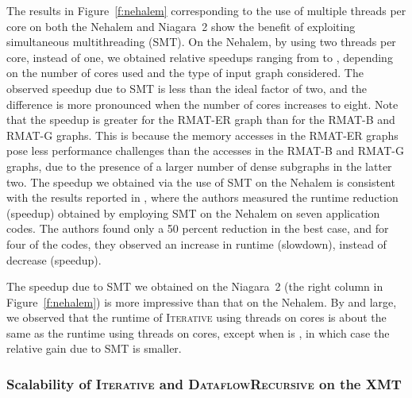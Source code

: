 \documentclass{article}
\begin{document}
The results in Figure~\ref{f:nehalem} corresponding to the use of multiple threads per core 
on both the Nehalem and Niagara~2 show the benefit of exploiting simultaneous multithreading (SMT).
On the Nehalem, by using two threads per core, instead of one,
we obtained relative speedups ranging  from  to , depending on the number of cores 
used and the type of input graph considered.
The observed speedup due to SMT is less than the ideal factor of two, and the difference
is more pronounced when the number of cores increases to  eight. 
Note that the speedup is greater for the RMAT-ER graph than for the RMAT-B and RMAT-G graphs.
This is because the memory accesses in the RMAT-ER graphs
pose less performance challenges than the accesses in the RMAT-B and RMAT-G graphs, 
due to the presence of a larger number of dense subgraphs in the latter two. 
The speedup we obtained via the use of SMT on the Nehalem is
consistent with the results reported in \cite{Barker},
where the authors measured the runtime reduction (speedup) obtained by 
employing SMT on the Nehalem on seven application codes. 
The authors found only a 50 percent reduction in the best case, 
and for four of the codes, they observed an increase in runtime (slowdown), 
instead of decrease (speedup). 

The speedup due to SMT we obtained on the Niagara~2 
(the right column in Figure~\ref{f:nehalem}) is more impressive than that on the Nehalem. 
By and large, we observed that the runtime of \textsc{Iterative} using  threads on  cores is
about the same as the runtime using  threads on  cores, except when   is , in which case the relative gain due to SMT is smaller.


\subsubsection{Scalability of \textsc{Iterative} and \textsc{DataflowRecursive}
on the XMT}
\end{document}
